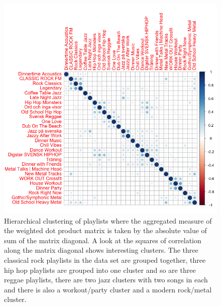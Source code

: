 \documentclass[a4paper,11pt]{kth-mag}
\begin{document}
\begin{figure}
\includegraphics[scale=0.5]{images/absSum.png}
\caption{Hierarchical clustering of playlists where the aggregated measure of the weighted dot product matrix is taken by the absolute value of sum of the matrix diagonal. A look at the squares of correlation along the matrix diagonal shows interesting clusters. The three classical rock playlists in the data set are grouped together, three hip hop playlists are grouped into one cluster and so are three reggae playlists, there are two jazz clusters with two songs in each and there is also a workout/party cluster and a modern rock/metal cluster.}
\label{absSum}
\end{figure}
\end{document}
